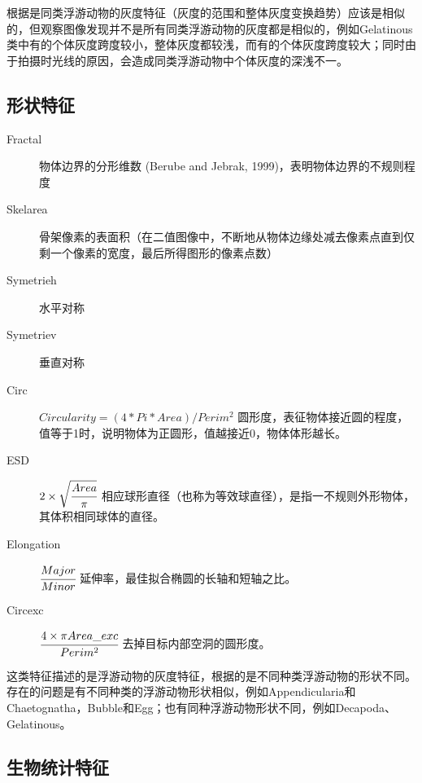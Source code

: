 
根据是同类浮游动物的灰度特征（灰度的范围和整体灰度变换趋势）应该是相似的，但观察图像发现并不是所有同类浮游动物的灰度都是相似的，例如Gelatinous类中有的个体灰度跨度较小，整体灰度都较浅，而有的个体灰度跨度较大；同时由于拍摄时光线的原因，会造成同类浮游动物中个体灰度的深浅不一。

\subsection{形状特征}

\begin{description}
    \item[Fractal] 物体边界的分形维数 (Berube and Jebrak, 1999)，表明物体边界的不规则程度
    \item[Skelarea] 骨架像素的表面积（在二值图像中，不断地从物体边缘处减去像素点直到仅剩一个像素的宽度，最后所得图形的像素点数）
    \item[Symetrieh] 水平对称
    \item[Symetriev] 垂直对称
    \item[Circ] $Circularity = (4 * Pi * Area) / Perim^2$ 圆形度，表征物体接近圆的程度，值等于1时，说明物体为正圆形，值越接近0，物体体形越长。
    \item[ESD] $2 \times \sqrt{\cfrac{Area}{\pi}}$ 相应球形直径（也称为等效球直径），是指一不规则外形物体，其体积相同球体的直径。
    \item[Elongation] $\cfrac{Major}{Minor}$ 延伸率，最佳拟合椭圆的长轴和短轴之比。
    \item[Circexc] $\cfrac{4 \times \pi Area\_exc}{Perim^{2}}$ 去掉目标内部空洞的圆形度。
\end{description}

这类特征描述的是浮游动物的灰度特征，根据的是不同种类浮游动物的形状不同。存在的问题是有不同种类的浮游动物形状相似，例如Appendicularia和Chaetognatha，Bubble和Egg；也有同种浮游动物形状不同，例如Decapoda、Gelatinous。

\subsection{生物统计特征}

